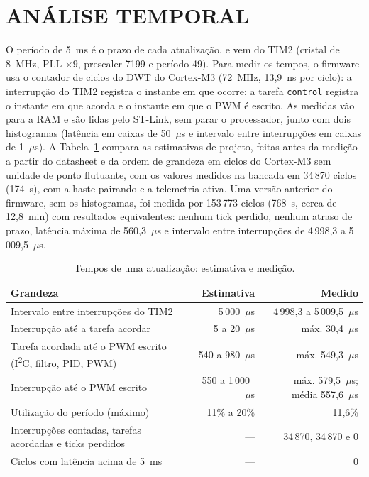 \section{ANÁLISE TEMPORAL}\label{sec:temporal}

O período de 5~ms é o prazo de cada atualização, e vem do TIM2 (cristal de 8~MHz, PLL $\times9$, prescaler 7199 e período 49). Para medir os tempos, o firmware usa o contador de ciclos do DWT do Cortex-M3 (72~MHz, 13,9~ns por ciclo): a interrupção do TIM2 registra o instante em que ocorre; a tarefa \texttt{control} registra o instante em que acorda e o instante em que o PWM é escrito. As medidas vão para a RAM e são lidas pelo ST-Link, sem parar o processador, junto com dois histogramas (latência em caixas de 50~$\mu$s e intervalo entre interrupções em caixas de 1~$\mu$s). A Tabela~\ref{tab:orcamento} compara as estimativas de projeto, feitas antes da medição a partir do datasheet e da ordem de grandeza em ciclos do Cortex-M3 sem unidade de ponto flutuante, com os valores medidos na bancada em 34\,870 ciclos (174~s), com a haste pairando e a telemetria ativa. Uma versão anterior do firmware, sem os histogramas, foi medida por 153\,773 ciclos (768~s, cerca de 12,8~min) com resultados equivalentes: nenhum tick perdido, nenhum atraso de prazo, latência máxima de 560,3~$\mu$s e intervalo entre interrupções de 4\,998,3 a 5\,009,5~$\mu$s.
\begin{table}[H]
\centering\caption{Tempos de uma atualização: estimativa e medição.}\label{tab:orcamento}
\begin{tabularx}{\textwidth}{Xrr}
\hline\textbf{Grandeza} & \textbf{Estimativa} & \textbf{Medido}\\\hline
Intervalo entre interrupções do TIM2 & 5\,000~$\mu$s & 4\,998,3 a 5\,009,5~$\mu$s\\
Interrupção até a tarefa acordar & 5 a 20~$\mu$s & máx. 30,4~$\mu$s\\
Tarefa acordada até o PWM escrito (I\textsuperscript{2}C, filtro, PID, PWM) & 540 a 980~$\mu$s & máx. 549,3~$\mu$s\\
Interrupção até o PWM escrito & 550 a 1\,000~$\mu$s & máx. 579,5~$\mu$s; média 557,6~$\mu$s\\
Utilização do período (máximo) & 11\% a 20\% & 11,6\%\\
Interrupções contadas, tarefas acordadas e ticks perdidos & --- & 34\,870, 34\,870 e 0\\
Ciclos com latência acima de 5~ms & --- & 0\\\hline
\end{tabularx}
\end{table}
